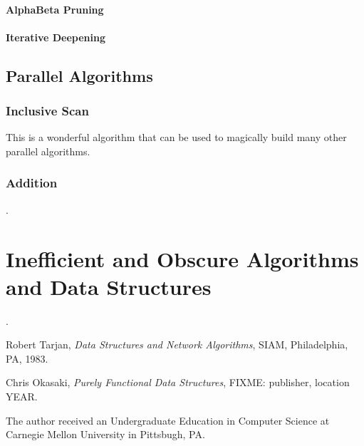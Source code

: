 \documentclass[12pt, letterpaper]{book}
\begin{document}
		\subsection{AlphaBeta Pruning}
		\subsection{Iterative Deepening}

	\chapter{Parallel Algorithms}

	\section{Inclusive Scan}

This is a wonderful algorithm that can be used to magically build many other parallel algorithms.

	\section{Addition}.

\part{Inefficient and Obscure Algorithms and Data Structures}

.



\begin{thebibliography}{9}

  Robert Tarjan,
  \emph{Data Structures and Network Algorithms},
  SIAM, Philadelphia, PA,
  1983.

  Chris Okasaki,
  \emph{Purely Functional Data Structures},
  FIXME: publisher, location
  YEAR.

	The author received an Undergraduate Education in Computer Science at Carnegie Mellon University in Pittsbugh, PA.

\end{thebibliography}



\end{document}
